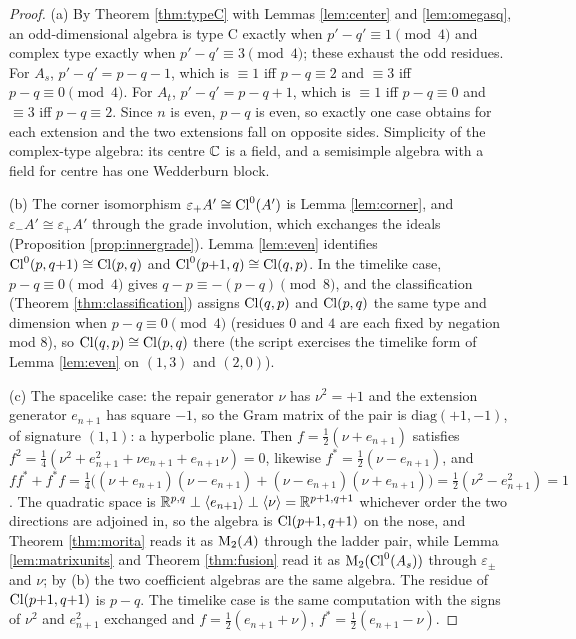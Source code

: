 \begin{proof}
(a) By Theorem \ref{thm:typeC} with Lemmas \ref{lem:center} and \ref{lem:omegasq}, an odd-dimensional algebra is type C exactly when $p' - q' \equiv 1 \pmod 4$ and complex type exactly when $p' - q' \equiv 3 \pmod 4$; these exhaust the odd residues. For $A_s$, $p' - q' = p - q - 1$, which is $\equiv 1$ iff $p - q \equiv 2$ and $\equiv 3$ iff $p - q \equiv 0 \pmod 4$. For $A_t$, $p' - q' = p - q + 1$, which is $\equiv 1$ iff $p - q \equiv 0$ and $\equiv 3$ iff $p - q \equiv 2$. Since $n$ is even, $p - q$ is even, so exactly one case obtains for each extension and the two extensions fall on opposite sides. Simplicity of the complex-type algebra: its centre $\mathbb{C}$ is a field, and a semisimple algebra with a field for centre has one Wedderburn block.

(b) The corner isomorphism $\varepsilon_+ A' \cong \mathrm{Cl}^0(A')$ is Lemma \ref{lem:corner}, and $\varepsilon_- A' \cong \varepsilon_+ A'$ through the grade involution, which exchanges the ideals (Proposition \ref{prop:innergrade}). Lemma \ref{lem:even} identifies $\mathrm{Cl}^0(p,q{+}1) \cong \mathrm{Cl}(p,q)$ and $\mathrm{Cl}^0(p{+}1,q) \cong \mathrm{Cl}(q,p)$. In the timelike case, $p - q \equiv 0 \pmod 4$ gives $q - p \equiv -(p-q) \pmod 8$, and the classification (Theorem \ref{thm:classification}) assigns $\mathrm{Cl}(q,p)$ and $\mathrm{Cl}(p,q)$ the same type and dimension when $p - q \equiv 0 \pmod 4$ (residues $0$ and $4$ are each fixed by negation mod 8), so $\mathrm{Cl}(q,p) \cong \mathrm{Cl}(p,q)$ there (the script exercises the timelike form of Lemma \ref{lem:even} on $(1,3)$ and $(2,0)$).

(c) The spacelike case: the repair generator $\nu$ has $\nu^2 = +1$ and the extension generator $e_{n+1}$ has square $-1$, so the Gram matrix of the pair is $\mathrm{diag}(+1,-1)$, of signature $(1,1)$: a hyperbolic plane. Then $f = \tfrac12(\nu + e_{n+1})$ satisfies $f^2 = \tfrac14(\nu^2 + e_{n+1}^2 + \nu e_{n+1} + e_{n+1}\nu) = 0$, likewise $f^* = \tfrac12(\nu - e_{n+1})$, and $ff^* + f^*f = \tfrac14\bigl((\nu + e_{n+1})(\nu - e_{n+1}) + (\nu - e_{n+1})(\nu + e_{n+1})\bigr) = \tfrac12(\nu^2 - e_{n+1}^2) = 1$. The quadratic space is $\mathbb{R}^{p,q} \perp \langle e_{n+1}\rangle \perp \langle \nu \rangle = \mathbb{R}^{p+1,q+1}$ whichever order the two directions are adjoined in, so the algebra is $\mathrm{Cl}(p{+}1,q{+}1)$ on the nose, and Theorem \ref{thm:morita} reads it as $\mathrm{M}_2(A)$ through the ladder pair, while Lemma \ref{lem:matrixunits} and Theorem \ref{thm:fusion} read it as $\mathrm{M}_2(\mathrm{Cl}^0(A_s))$ through $\varepsilon_\pm$ and $\nu$; by (b) the two coefficient algebras are the same algebra. The residue of $\mathrm{Cl}(p{+}1,q{+}1)$ is $p - q$. The timelike case is the same computation with the signs of $\nu^2$ and $e_{n+1}^2$ exchanged and $f = \tfrac12(e_{n+1} + \nu)$, $f^* = \tfrac12(e_{n+1} - \nu)$.


\end{proof}

